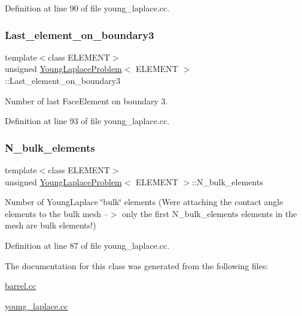 Definition at line 90 of file young\+\_\+laplace.\+cc.

\mbox{\label{classYoungLaplaceProblem_a5c9ac739e14a03c0dd36ff7407382814}} 
\subsubsection{\texorpdfstring{Last\+\_\+element\+\_\+on\+\_\+boundary3}{Last\_element\_on\_boundary3}}
{\footnotesize\ttfamily template$<$class E\+L\+E\+M\+E\+NT$>$ \\
unsigned \hyperlink{classYoungLaplaceProblem}{Young\+Laplace\+Problem}$<$ E\+L\+E\+M\+E\+NT $>$\+::Last\+\_\+element\+\_\+on\+\_\+boundary3\hspace{0.3cm}{\ttfamily [private]}}



Number of last Face\+Element on boundary 3. 



Definition at line 93 of file young\+\_\+laplace.\+cc.

\mbox{\label{classYoungLaplaceProblem_a4dc49a3807638823ac2157d67e8fed4a}} 
\subsubsection{\texorpdfstring{N\+\_\+bulk\+\_\+elements}{N\_bulk\_elements}}
{\footnotesize\ttfamily template$<$class E\+L\+E\+M\+E\+NT$>$ \\
unsigned \hyperlink{classYoungLaplaceProblem}{Young\+Laplace\+Problem}$<$ E\+L\+E\+M\+E\+NT $>$\+::N\+\_\+bulk\+\_\+elements\hspace{0.3cm}{\ttfamily [private]}}



Number of Young\+Laplace \char`\"{}bulk\char`\"{} elements (We\textquotesingle{}re attaching the contact angle elements to the bulk mesh --$>$ only the first N\+\_\+bulk\+\_\+elements elements in the mesh are bulk elements!) 



Definition at line 87 of file young\+\_\+laplace.\+cc.



The documentation for this class was generated from the following files\+:\begin{DoxyCompactItemize}
\item 
\hyperlink{barrel_8cc}{barrel.\+cc}\item 
\hyperlink{young__laplace_8cc}{young\+\_\+laplace.\+cc}\end{DoxyCompactItemize}
